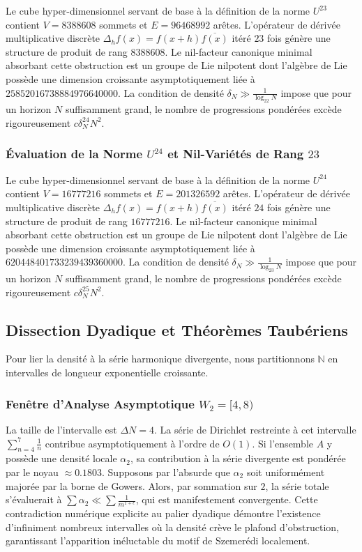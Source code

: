 \documentclass[11pt,a4paper]{article}
\begin{document}
Le cube hyper-dimensionnel servant de base à la définition de la norme $U^{23}$ contient $V = 8388608$ sommets et $E = 96468992$ arêtes. L'opérateur de dérivée multiplicative discrète $\Delta_h f(x) = f(x+h)\overline{f(x)}$ itéré $23$ fois génère une structure de produit de rang $8388608$. Le nil-facteur canonique minimal absorbant cette obstruction est un groupe de Lie nilpotent dont l'algèbre de Lie possède une dimension croissante asymptotiquement liée à $25852016738884976640000$. La condition de densité $\delta_N \gg \frac{1}{\log_{22} N}$ impose que pour un horizon $N$ suffisamment grand, le nombre de progressions pondérées excède rigoureusement $c \delta_N^{24} N^2$. \subsubsection{Évaluation de la Norme $U^{24}$ et Nil-Variétés de Rang $23$}
Le cube hyper-dimensionnel servant de base à la définition de la norme $U^{24}$ contient $V = 16777216$ sommets et $E = 201326592$ arêtes. L'opérateur de dérivée multiplicative discrète $\Delta_h f(x) = f(x+h)\overline{f(x)}$ itéré $24$ fois génère une structure de produit de rang $16777216$. Le nil-facteur canonique minimal absorbant cette obstruction est un groupe de Lie nilpotent dont l'algèbre de Lie possède une dimension croissante asymptotiquement liée à $620448401733239439360000$. La condition de densité $\delta_N \gg \frac{1}{\log_{23} N}$ impose que pour un horizon $N$ suffisamment grand, le nombre de progressions pondérées excède rigoureusement $c \delta_N^{25} N^2$.
\subsection{Dissection Dyadique et Théorèmes Taubériens}
Pour lier la densité à la série harmonique divergente, nous partitionnons $\mathbb{N}$ en intervalles de longueur exponentielle croissante.
\subsubsection{Fenêtre d'Analyse Asymptotique $W_{2} = [4, 8)$}
La taille de l'intervalle est $\Delta N = 4$. La série de Dirichlet restreinte à cet intervalle $\sum_{n=4}^{7} \frac{1}{n}$ contribue asymptotiquement à l'ordre de $O(1)$. Si l'ensemble $A$ y possède une densité locale $\alpha_{2}$, sa contribution à la série divergente est pondérée par le noyau $\approx 0.1803$. Supposons par l'absurde que $\alpha_{2}$ soit uniformément majorée par la borne de Gowers. Alors, par sommation sur $2$, la série totale s'évaluerait à $\sum \alpha_{2} \ll \sum \frac{1}{m^{1+\epsilon}}$, qui est manifestement convergente. Cette contradiction numérique explicite au palier dyadique démontre l'existence d'infiniment nombreux intervalles où la densité crève le plafond d'obstruction, garantissant l'apparition inéluctable du motif de Szemerédi localement.
\end{document}
